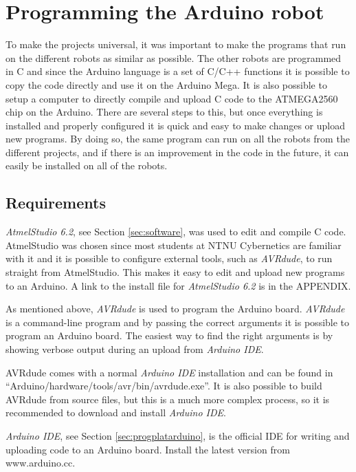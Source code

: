 \section{Programming the Arduino robot}
To make the projects universal, it was important to make the programs that run on the different robots as similar as possible. The other robots are programmed in C and since the Arduino language is a set of C/C++ functions it is possible to copy the code directly and use it on the Arduino Mega. It is also possible to setup a computer to directly compile and upload C code to the ATMEGA2560 chip on the Arduino. There are several steps to this, but once everything is installed and properly configured it is quick and easy to make changes or upload new programs. By doing so, the same program can run on all the robots from the different projects, and if there is an improvement in the code in the future, it can easily be installed on all of the robots.

\subsection{Requirements}
\textit{AtmelStudio 6.2}, see Section \ref{sec:software}, was used to edit and compile C code. AtmelStudio was chosen since most students at NTNU Cybernetics are familiar with it and it is possible to configure external tools, such as \textit{AVRdude}, to run straight from AtmelStudio. This makes it easy to edit and upload new programs to an Arduino. A link to the install file for \textit{AtmelStudio 6.2} is in the APPENDIX. 

As mentioned above, \textit{AVRdude} is used to program the Arduino board. \textit{AVRdude} is a command-line program and by passing the correct arguments it is possible to program an Arduino board. The easiest way to find the right arguments is by showing verbose output during an upload from \textit{Arduino IDE}.

AVRdude comes with a normal \textit{Arduino IDE} installation and can be found in ``Arduino/hardware/tools/avr/bin/avrdude.exe''. It is also possible to build AVRdude from source files, but this is a much more complex process, so it is recommended to download and install \textit{Arduino IDE}.

\textit{Arduino IDE}, see Section \ref{sec:progplatarduino}, is the official IDE for writing and uploading code to an Arduino board. Install the latest version from www.arduino.cc.

